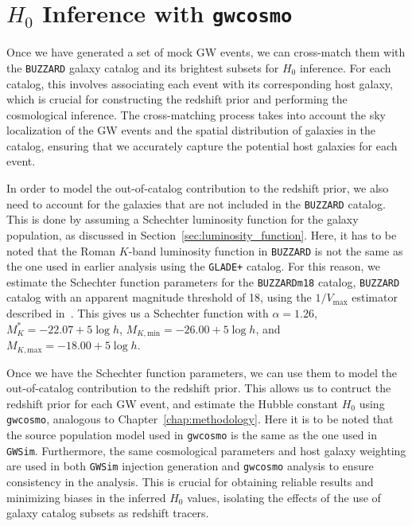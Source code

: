\section{$H_0$ Inference with \texttt{gwcosmo}}
Once we have generated a set of mock \ac{GW} events, we can cross-match them with the \texttt{BUZZARD} galaxy catalog and its brightest subsets for $H_0$ inference. For each catalog, this involves associating each event with its corresponding host galaxy, which is crucial for constructing the redshift prior and performing the cosmological inference. The cross-matching process takes into account the sky localization of the \ac{GW} events and the spatial distribution of galaxies in the catalog, ensuring that we accurately capture the potential host galaxies for each event.

In order to model the out-of-catalog contribution to the redshift prior, we also need to account for the galaxies that are not included in the \texttt{BUZZARD} catalog. This is done by assuming a Schechter luminosity function for the galaxy population, as discussed in Section~\ref{sec:luminosity_function}. Here, it has to be noted that the Roman $K$-band luminosity function in \texttt{BUZZARD} is not the same as the one used in earlier analysis using the \texttt{GLADE+} catalog. For this reason, we estimate the Schechter function parameters for the \texttt{BUZZARDm18} catalog, \texttt{BUZZARD} catalog with an apparent magnitude threshold of 18, using the $1/V_{\mathrm{max}}$ estimator described in~\citet{schmidt1968space,takeuchi2000tests}. This gives us a Schechter function with $\alpha=1.26$, $M^*_{K} = -22.07 +5\log h$, $M_{K, \mathrm{min}} = -26.00 +5\log h$, and $M_{K, \mathrm{max}} = -18.00 +5\log h$.

Once we have the Schechter function parameters, we can use them to model the out-of-catalog contribution to the redshift prior. This allows us to contruct the redshift prior for each \ac{GW} event, and estimate the Hubble constant $H_0$ using \texttt{gwcosmo}, analogous to Chapter~\ref{chap:methodology}. Here it is to be noted that the source population model used in \texttt{gwcosmo} is the same as the one used in \texttt{GWSim}. Furthermore, the same cosmological parameters and host galaxy weighting are used in both \texttt{GWSim} injection generation and \texttt{gwcosmo} analysis to ensure consistency in the analysis. This is crucial for obtaining reliable results and minimizing biases in the inferred $H_0$ values, isolating the effects of the use of galaxy catalog subsets as redshift tracers.

